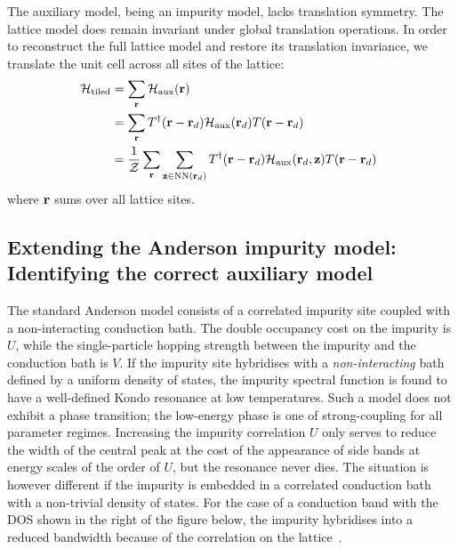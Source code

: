 \documentclass[reprint,hidelinks,onecolumn]{revtex4-2}
\begin{document}
The auxiliary model, being an impurity model, lacks translation symmetry. The lattice model does remain invariant under global translation operations. In order to reconstruct the full lattice model and restore its translation invariance, we translate the unit cell across all sites of the lattice:
\begin{equation}\begin{aligned}
	\label{tilingPrescription}
	\mathcal{H}_\text{tiled} &= \sum_{{\bf r}}\mathcal{H}_\text{aux}({\bf r})\\
				&= \sum_{{\bf r}}T^\dagger({\bf r} - {\bf r}_d)\mathcal{H}_\text{aux}({\bf r}_d)T({\bf r} - {\bf r}_d)~ \\
				&= \frac{1}{\mathcal{Z}}\sum_{{\bf r}}\sum_{{\bf z}\in\text{NN}({\bf r}_d)}T^\dagger({\bf r} - {\bf r}_d)\mathcal{H}_\text{aux}({\bf r}_d, {\bf z})T({\bf r} - {\bf r}_d)~ \\
\end{aligned}\end{equation}
where \({\bf r}\) sums over all lattice sites.

\subsection{Extending the Anderson impurity model: Identifying the correct auxiliary model}\label{identifyModel}
The standard Anderson model consists of a correlated impurity site coupled with a non-interacting conduction bath. The double occupancy cost on the impurity is \(U\), while the single-particle hopping strength between the impurity and the conduction bath is \(V\). If the impurity site hybridises with a {\it non-interacting} bath defined by a uniform density of states, the impurity spectral function is found to have a well-defined Kondo resonance at low temperatures. Such a model does not exhibit a phase transition; the low-energy phase is one of strong-coupling for all parameter regimes. Increasing the impurity correlation \(U\) only serves to reduce the width of the central peak at the cost of the appearance of side bands at energy scales of the order of \(U\), but the resonance never dies. The situation is however different if the impurity is embedded in a correlated conduction bath with a non-trivial density of states. For the case of a conduction band with the DOS shown in the right of the figure below, the impurity hybridises into a reduced bandwidth because of the correlation on the lattice~\cite{held_2013}.
\end{document}
